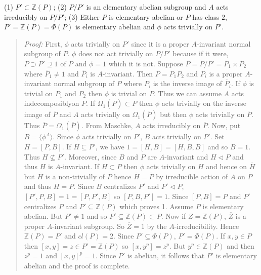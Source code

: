 (1) $P' \subset {\mathbb Z}(P)$;
(2) $P/P'$ is an elementary abelian subgroup and $A$ acts irreducibly on $P/P'$;
(3) Either $P$ is elementary abelian or $P$ has class $2$, $P' = {\mathbb Z}(P) = \Phi(P)$
is elementary abelian and $\phi$ acts trivially on $P'$.
\begin{quote}
\emph{Proof:}  First, $\phi$ acts trivially on $P'$ since it is a proper $A$-invariant normal
subgroup of $P$.  $\phi$ does not act trivially on $P/P'$ because if it were,
$P \supset P' \supseteq 1$ of $P$ and $\phi= 1$ which it is not.
Suppose ${\overline P}= P/P' = {\overline P}_1 \times {\overline P}_2$ where
${\overline P}_1 \ne 1$ and
${\overline P}_i$ is $A$-invariant.  Then $P= P_1 P_2$ and $P_i$ is a proper
$A$-invariant normal subgroup of $P$ where $P_i$ is the inverse image of ${\overline P}_i$.
If $\phi$ is trivial on $P_1$ and $P_2$ then $\phi$ is trivial on $P$.
Thus we can assume $A$ acts indecomposiblyon ${\overline P}$.
If $\Omega_1({\overline P}) \subset {\overline P}$ then $\phi$ acts trivially on the
inverse image of ${\overline P}$ and $A$ acts trivially on
$\Omega_1({\overline P})$ but then $\phi$ acts trivially on ${\overline P}$.
Thus ${\overline P} = \Omega_1({\overline P})$.  From Maschke, $A$ acts irreducibly on
${\overline P}$.  Now, put $B= \langle \phi^A \rangle$.  Since $\phi$ acts trivially
on $P'$, $B$ acts trivially on $P'$.  Set $H= [P, B]$.  If $H \subseteq P'$, we have
$1 = [H,B]= [H, B, B]$ and so $B=1$.  Thus $H \nsubseteq P'$.
Moreover, since $B$ and $P$ are $A$-invariant and $H \lhd P$ and thus $H$ is $A$-invariant.
If $H \subset P$ then $\phi$ acts trivially on $H$ and hence on ${\overline H}$ but ${\overline H}$ is a non-trivially of ${\overline P}$
hence ${\overline H} = {\overline P}$ by irreducible action of $A$ on ${\overline P}$ and
thus $H = P$.  Since $B$ centralizes $P'$ and $P' \lhd P$, $[P',P,B] = 1 = [P, P', B]$
so $[P, B, P'] = 1$.  Since $[P, B] = P$ and $P'$ centralizes $P$ and $P' \subseteq {\mathbb Z}(P)$ which proves 1.
Assume $P$ is elementary abelian.  But $P' \ne 1$ and so $P' \subseteq {\mathbb Z}(P) \subset P$.
Now if $Z= {\mathbb Z}(P)$, ${\overline Z}$ is a proper $A$-invariant subgroup.  So
${\overline Z} = 1$ by the $A$-irreducibility.  Hence ${\mathbb Z}(P) = P'$ and
$cl(P)=2$.  Since $P' \subseteq \Phi(P)$, $P' = \Phi(P)$.
If $x, y \in P$ then $[x, y]= z \in  P'= {\mathbb Z}(P)$  so $[x,y^p]= z^p$.  But
$y^p \in {\mathbb Z}(P)$ and then $z^p= 1$ and $[x,y]^p= 1$.  Since $P'$ is abelian,
it follows that $P'$ is elementary abelian and the proof is complete.
\end{quote}
